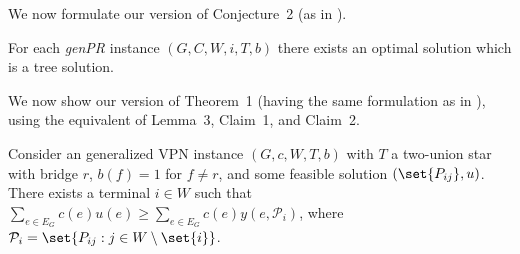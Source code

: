 We now formulate our version of Conjecture~2 (as in \cite{grandoni2008short}).
\renewcommand\theconjecture{2}
\begin{conjecture}
    For each \emph{genPR} instance $(G, C, W, i, T, b)$ there exists an optimal solution which is a tree solution.
\end{conjecture}

We now show our version of Theorem~1 (having the same formulation as in \cite{grandoni2008short}), using the equivalent of Lemma~3, Claim~1, and Claim~2.

\renewcommand\thelemma{3}
\begin{lemma}
    Consider an generalized VPN instance $(G, c, W, T, b)$ with $T$ a two-union star with bridge $r$, $b(f) = 1$ for $f \neq r$, and some feasible solution $(\set{P_{ij}}, u)$.
    There exists a terminal $i \in W$ such that $\sum_{e \in E_G} c(e) u(e) \ge \sum_{e \in E_G} c(e) y(e, \mathcal P_i)$, where $\mathcal P_i = \set{P_{ij} : j \in W \setminus \set{i}}$.
\end{lemma}

